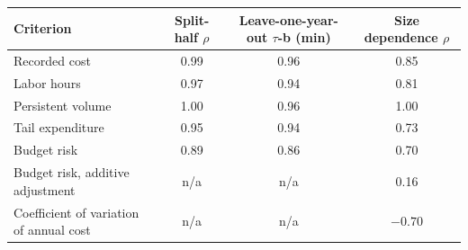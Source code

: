 \begin{tabular}{p{5.0cm}ccc}
\toprule
Criterion & Split-half $\rho$ & Leave-one-year-out $\tau$-b (min) & Size dependence $\rho$ \\
\midrule
Recorded cost & 0.99 & 0.96 & 0.85 \\
Labor hours & 0.97 & 0.94 & 0.81 \\
Persistent volume & 1.00 & 0.96 & 1.00 \\
Tail expenditure & 0.95 & 0.94 & 0.73 \\
Budget risk & 0.89 & 0.86 & 0.70 \\
Budget risk, additive adjustment & n/a & n/a & 0.16 \\
Coefficient of variation of annual cost & n/a & n/a & $-0.70$ \\
\bottomrule
\end{tabular}
